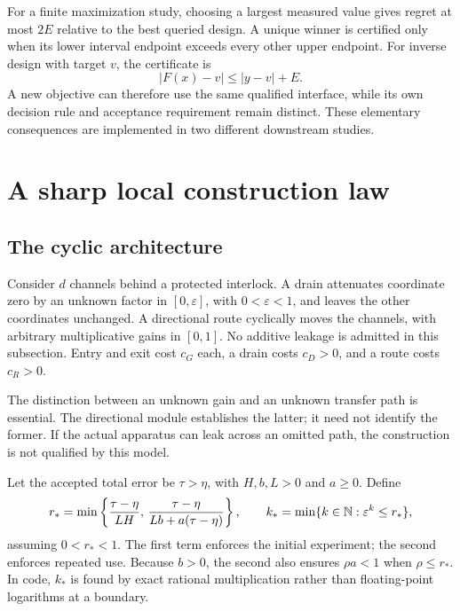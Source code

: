 \documentclass[11pt,letterpaper]{article}
\theoremstyle{definition}\newtheorem{definition}[theorem]{Definition}
\theoremstyle{remark}\newtheorem{remark}[theorem]{Remark}
\begin{document}
For a finite maximization study, choosing a largest measured value gives regret at most $2E$ relative to the best queried design. A unique winner is certified only when its lower interval endpoint exceeds every other upper endpoint. For inverse design with target $v$, the certificate is
\begin{equation}
 |F(x)-v|\leq |y-v|+E.
 \label{eq:inverse}
\end{equation}
A new objective can therefore use the same qualified interface, while its own decision rule and acceptance requirement remain distinct. These elementary consequences are implemented in two different downstream studies.

\section{A sharp local construction law}
\label{sec:optimal}
\subsection{The cyclic architecture}
Consider $d$ channels behind a protected interlock. A drain attenuates coordinate zero by an unknown factor in $[0,\varepsilon]$, with $0<\varepsilon<1$, and leaves the other coordinates unchanged. A directional route cyclically moves the channels, with arbitrary multiplicative gains in $[0,1]$. No additive leakage is admitted in this subsection. Entry and exit cost $c_G$ each, a drain costs $c_D>0$, and a route costs $c_R>0$.

The distinction between an unknown gain and an unknown transfer path is essential. The directional module establishes the latter; it need not identify the former. If the actual apparatus can leak across an omitted path, the construction is not qualified by this model.

Let the accepted total error be $\tau>\eta$, with $H,b,L>0$ and $a\geq0$. Define
\begin{equation}
 r_* =\min\left\{\frac{\tau-\eta}{LH},\,
                  \frac{\tau-\eta}{Lb+a(\tau-\eta)}\right\},
 \qquad
 k_* =\min\{k\in\mathbb N:\varepsilon^k\leq r_*\},
 \label{eq:k}
\end{equation}
assuming $0<r_*<1$. The first term enforces the initial experiment; the second enforces repeated use. Because $b>0$, the second also ensures $\rho a<1$ when $\rho\leq r_*$. In code, $k_*$ is found by exact rational multiplication rather than floating-point logarithms at a boundary.
\end{document}
